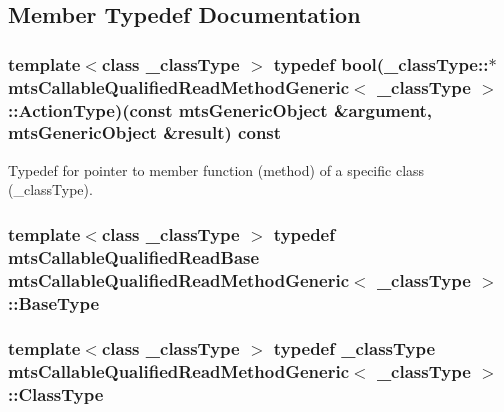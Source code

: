 \subsection{Member Typedef Documentation}
\hypertarget{classmts_callable_qualified_read_method_generic_acf52fbc6f885178cd934f20cfcd96872}{
\subsubsection[{Action\-Type}]{\setlength{\rightskip}{0pt plus 5cm}template$<$class \-\_\-class\-Type $>$ typedef bool(\-\_\-class\-Type\-::$\ast$ {\bf mts\-Callable\-Qualified\-Read\-Method\-Generic}$<$ \-\_\-class\-Type $>$\-::Action\-Type)(const {\bf mts\-Generic\-Object} \&argument, {\bf mts\-Generic\-Object} \&result) const }}\label{classmts_callable_qualified_read_method_generic_acf52fbc6f885178cd934f20cfcd96872}
Typedef for pointer to member function (method) of a specific class (\-\_\-class\-Type). \hypertarget{classmts_callable_qualified_read_method_generic_a773d5a3d8a4847835a36aa9ccfb93774}{
\subsubsection[{Base\-Type}]{\setlength{\rightskip}{0pt plus 5cm}template$<$class \-\_\-class\-Type $>$ typedef {\bf mts\-Callable\-Qualified\-Read\-Base} {\bf mts\-Callable\-Qualified\-Read\-Method\-Generic}$<$ \-\_\-class\-Type $>$\-::{\bf Base\-Type}}}\label{classmts_callable_qualified_read_method_generic_a773d5a3d8a4847835a36aa9ccfb93774}
\hypertarget{classmts_callable_qualified_read_method_generic_ada2d394b00a2db849dd5d67b965fd63b}{
\subsubsection[{Class\-Type}]{\setlength{\rightskip}{0pt plus 5cm}template$<$class \-\_\-class\-Type $>$ typedef \-\_\-class\-Type {\bf mts\-Callable\-Qualified\-Read\-Method\-Generic}$<$ \-\_\-class\-Type $>$\-::{\bf Class\-Type}}}\label{classmts_callable_qualified_read_method_generic_ada2d394b00a2db849dd5d67b965fd63b}
